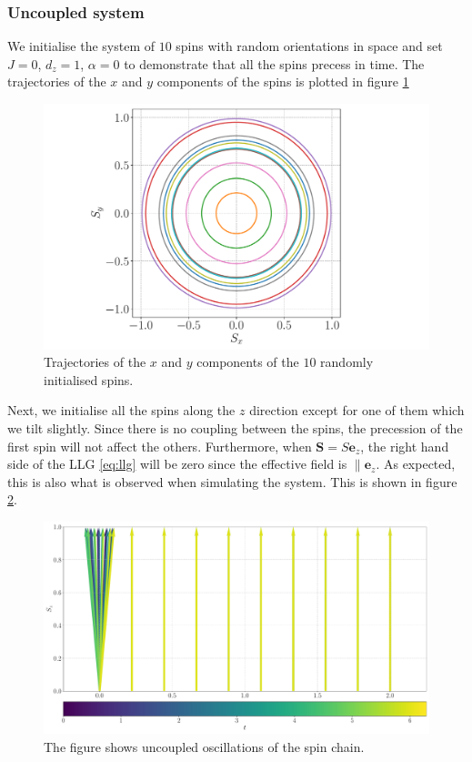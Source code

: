 \subsubsection{Uncoupled system}

We initialise the system of $10$ spins with random orientations in space and set $J = 0$, $d_z = 1$, $\alpha = 0$ to demonstrate that all the spins precess in time. The trajectories of the $x$ and $y$ components of the spins is plotted in figure \ref{fig:precessionsxy}

\begin{figure}[htb]
	\centering
	\includegraphics[width=0.8\columnwidth]{../fig/precession_xy.pdf}
	\caption{Trajectories of the $x$ and $y$ components of the $10$ randomly initialised spins.}
	\label{fig:precessionsxy}
\end{figure}

Next, we initialise all the spins along the $z$ direction except for one of them which we tilt slightly. Since there is no coupling between the spins, the precession of the first spin will not affect the others. Furthermore, when $\mathbf{S} = S\mathbf{e}_z$, the right hand side of the LLG \eqref{eq:llg} will be zero since the effective field is $\parallel \mathbf{e}_z$. As expected, this is also what is observed when simulating the system. This is shown in figure \ref{fig:precessions}.

\begin{figure}[htb]
	\centering
	\includegraphics[width=\columnwidth]{../fig/10_precessions.pdf}
	\caption{The figure shows uncoupled oscillations of the spin chain.}
	\label{fig:precessions}
\end{figure}

